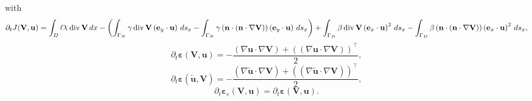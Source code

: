 \documentclass[preview]{standalone}
\let\oldcdot\cdot
\let\cdot\oldcdot
\begin{document}
with
\begin{dmath*}
\partial_{t} J({\mathbf V},{\mathbf{ u }}) =  \int_{D} \ell \raisebox{\depth}{$\chi$} \operatorname{div} {\mathbf V} \,dx - \left( \int_{\Gamma_N} \gamma \operatorname{div} {\mathbf V} \left( \mathbf e_y \cdot {\mathbf{ u }} \right) \,ds_x -  \int_{\Gamma_N} \gamma \left( \mathbf n \cdot \left( \mathbf n \cdot  \nabla {\mathbf V}  \right) \right) \left( \mathbf e_y \cdot {\mathbf{ u }} \right) \,ds_x\right) +  \int_{\Gamma_D} \beta \operatorname{div} {\mathbf V} \left( \mathbf e_x \cdot {\mathbf{ u }} \right)^{2} \,ds_x -  \int_{\Gamma_D} \beta \left( \mathbf n \cdot \left( \mathbf n \cdot  \nabla {\mathbf V}  \right) \right) \left( \mathbf e_x \cdot {\mathbf{ u }} \right)^{2} \,ds_x,
 \end{dmath*}
\begin{dmath*}
\partial_{t} \bm\varepsilon({\mathbf V},{\mathbf{ u }}) = - \frac{\left(  \nabla {\mathbf{ u }}  \cdot  \nabla {\mathbf V}  \right) +  \left( \left(  \nabla {\mathbf{ u }}  \cdot  \nabla {\mathbf V}  \right) \right)^\top }{2},
 \end{dmath*}
\begin{dmath*}
\partial_{t} \pmb\varepsilon(\tilde{\mathbf{ u }},{\mathbf V}) = - \frac{\left(  \nabla \tilde{\mathbf{ u }}  \cdot  \nabla {\mathbf V}  \right) +  \left( \left(  \nabla \tilde{\mathbf{ u }}  \cdot  \nabla {\mathbf V}  \right) \right)^\top }{2},
 \end{dmath*}
\begin{dmath*}
\partial_{t} \pmb\varepsilon_e({\mathbf V},{\mathbf{ u }}) = \partial_{t} \bm\varepsilon({\mathbf V},{\mathbf{ u }}).
 \end{dmath*}
\end{document}
